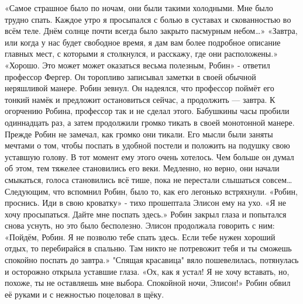 \documentclass[a4paper,12pt]{book}
\begin{document}
	«Самое страшное было по ночам, они были такими холодными. Мне было трудно спать. Каждое утро я просыпался с болью в суставах и скованностью во всём теле. Днём солнце почти всегда было закрыто пасмурным небом…»
	«Завтра, или когда у нас будет свободное время, я дам вам более подробное описание главных мест, с которыми я столкнулся, и расскажу, где они расположены.»
	«Хорошо. Это может может оказаться весьма полезным, Робин» - ответил профессор Фергер. Он торопливо записывал заметки в своей обычной неряшливой манере.
	Робин зевнул. Он надеялся, что профессор поймёт его тонкий намёк и предложит остановиться сейчас, а продолжить — завтра. К огорчению Робина, профессор так и не сделал этого. Бабушкины часы пробили одиннадцать раз, а затем продолжили громко тикать в своей монотонной манере. Прежде Робин не замечал, как громко они тикали. Его мысли были заняты мечтами о том, чтобы поспать в удобной постели и положить на подушку свою уставшую голову. В тот момент ему этого очень хотелось. Чем больше он думал об этом, тем тяжелее становились его веки. Медленно, но верно, они начали смыкаться, голоса становились всё тише, пока не перестали слышаться совсем…
	Следующим, что вспомнил Робин, было то, как его легонько встряхнули.
	«Робин, проснись. Иди в свою кроватку» - тихо прошептала Элисон ему на ухо.
	«Я не хочу просыпаться. Дайте мне поспать здесь.»
	Робин закрыл глаза и попытался снова уснуть, но это было бесполезно. Элисон продолжала говорить с ним:
	«Пойдём, Робин. Я не позволю тебе спать здесь. Если тебе нужен хороший отдых, то перебирайся в спальню. Там никто не потревожит тебя и ты сможешь спокойно поспать до завтра.»
	"Спящая красавица" вяло пошевелилась, потянулась и осторожно открыла уставшие глаза.
	«Ох, как я устал! Я не хочу вставать, но, похоже, ты не оставляешь мне выбора. Спокойной ночи, Элисон!»
	Робин обвил её руками и с нежностью поцеловал в щёку.
\end{document}
